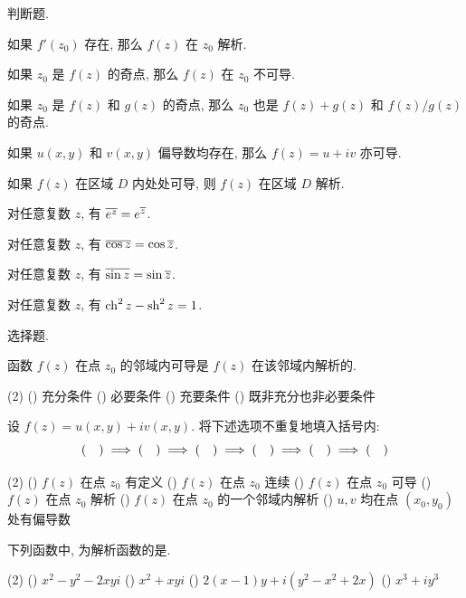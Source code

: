 \sectionHomework
\begin{homework}
	\item 判断题.
		\begin{exlist}
			\item 如果 $f'(z_0)$ 存在, 那么 $f(z)$ 在 $z_0$ 解析.\fillbrace{}
			\item 如果 $z_0$ 是 $f(z)$ 的奇点, 那么 $f(z)$ 在 $z_0$ 不可导.\fillbrace{}
			\item 如果 $z_0$ 是 $f(z)$ 和 $g(z)$ 的奇点, 那么 $z_0$ 也是 $f(z)+g(z)$ 和 $f(z)/g(z)$ 的奇点.\fillbrace{}
			\item 如果 $u(x,y)$ 和 $v(x,y)$ 偏导数均存在, 那么 $f(z)=u+iv$ 亦可导.\fillbrace{}
      \item 如果 $f(z)$ 在区域 $D$ 内处处可导, 则 $f(z)$ 在区域 $D$ 解析. \fillbrace{}
			\item 对任意复数 $z$, 有 $\overline{e^z}=e^{\overline z}$.\fillbrace{}
			\item 对任意复数 $z$, 有 $\overline{\cos z}=\cos{\overline z}$.\fillbrace{}
			\item 对任意复数 $z$, 有 $\overline{\sin z}=\sin{\overline z}$.\fillbrace{}
			\item 对任意复数 $z$, 有 $\operatorname{ch}^2z-\operatorname{sh}^2z=1$.\fillbrace{}
		\end{exlist}
	\item 选择题.
		\begin{exlist}
			\item 函数 $f(z)$ 在点 $z_0$ 的邻域内可导是 $f(z)$ 在该邻域内解析的\fillbrace{}.
				\begin{taskschoice}(2)
					() 充分条件
					() 必要条件
					() 充要条件
					() 既非充分也非必要条件
				\end{taskschoice}
			\item 设 $f(z)=u(x,y)+iv(x,y)$. 将下述选项不重复地填入括号内:
			\[\fillbrace{}\implies
				\fillbrace{}\implies
				\fillbrace{}\implies
				\fillbrace{}\implies
				\fillbrace{}\implies
				\fillbrace{}\]
				\begin{taskschoice}(2)
					() $f(z)$ 在点 $z_0$ 有定义
					() $f(z)$ 在点 $z_0$ 连续
					() $f(z)$ 在点 $z_0$ 可导
					() $f(z)$ 在点 $z_0$ 解析
					() $f(z)$ 在点 $z_0$ 的一个邻域内解析
					() $u,v$ 均在点 $(x_0,y_0)$ 处有偏导数
				\end{taskschoice}
			\item 下列函数中, 为解析函数的是\fillbrace{}.
				\begin{taskschoice}(2)
					() $x^2-y^2-2xyi$
					() $x^2+xyi$
					() $2(x-1)y+i(y^2-x^2+2x)$
					() $x^3+iy^3$
				\end{taskschoice}

\end{exlist}
\end{homework}
